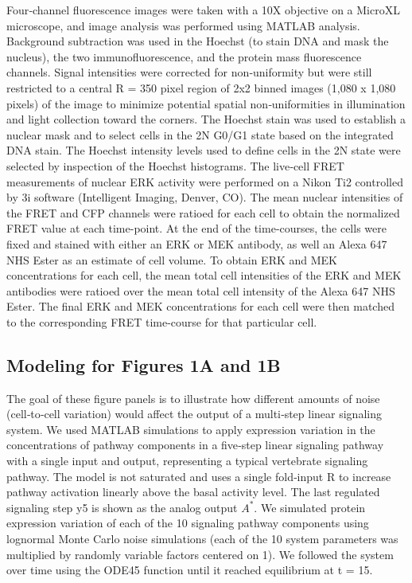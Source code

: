 Four‐channel fluorescence images were taken with a 10X objective on a MicroXL microscope, and image analysis was performed using MATLAB analysis. Background subtraction was used in the Hoechst (to stain DNA and mask the nucleus), the two immunofluorescence, and the protein mass fluorescence channels. Signal intensities were corrected for non‐uniformity but were still restricted to a central R = 350 pixel region of 2x2 binned images (1,080 x 1,080 pixels) of the image to minimize potential spatial non‐uniformities in illumination and light collection toward the corners. The Hoechst stain was used to establish a nuclear mask and to select cells in the 2N G0/G1 state based on the integrated DNA stain. The Hoechst intensity levels used to define cells in the 2N state were selected by inspection of the Hoechst histograms. The live‐cell FRET measurements of nuclear ERK activity were performed on a Nikon Ti2 controlled by 3i software (Intelligent Imaging, Denver, CO). The mean nuclear intensities of the FRET and CFP channels were ratioed for each cell to obtain the normalized FRET value at each time-point. At the end of the time-courses, the cells were fixed and stained with either an ERK or MEK antibody, as well an Alexa 647 NHS Ester as an estimate of cell volume. To obtain ERK and MEK concentrations for each cell, the mean total cell intensities of the ERK and MEK antibodies were ratioed over the mean total cell intensity of the Alexa 647 NHS Ester. The final ERK and MEK concentrations for each cell were then matched to the corresponding FRET time-course for that particular cell.

\subsection{Modeling for Figures 1A and 1B}

The goal of these figure panels is to illustrate how different amounts of noise (cell‐to‐cell variation) would affect the output of a multi‐step linear signaling system. We used MATLAB simulations to apply expression variation in the concentrations of pathway components in a five‐step linear signaling pathway with a single input and output, representing a typical vertebrate signaling pathway. The model is not saturated and uses a single fold‐input R to increase pathway activation linearly above the basal activity level. The last regulated signaling step y5 is shown as the analog output $A^*$. We simulated protein expression variation of each of the 10 signaling pathway components using lognormal Monte Carlo noise simulations (each of the 10 system parameters was multiplied by randomly variable factors centered on 1). We followed the system over time using the ODE45 function until it reached equilibrium at t = 15.

